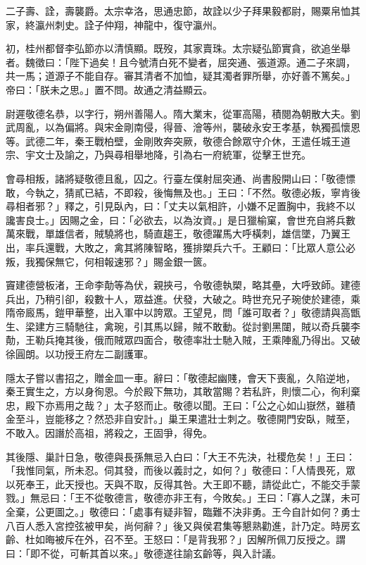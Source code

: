 \begin{pinyinscope}
 二子壽、詮，壽襲爵。太宗幸洛，思通忠節，故詮以少子拜果毅都尉，賜粟帛恤其家，終瀛州刺史。詮子仲翔，神龍中，復守瀛州。



 初，桂州都督李弘節亦以清慎顯。既歿，其家賣珠。太宗疑弘節實貪，欲追坐舉者。魏徵曰：「陛下過矣！且今號清白死不變者，屈突通、張道源。通二子來調，共一馬；道源子不能自存。審其清者不加恤，疑其濁者罪所舉，亦好善不篤矣。」帝曰：「朕未之思。」置不問。故通之清益顯云。



 尉遲敬德名恭，以字行，朔州善陽人。隋大業末，從軍高陽，積閱為朝散大夫。劉武周亂，以為偏將。與宋金剛南侵，得晉、澮等州，襲破永安王孝基，執獨孤懷恩等。武德二年，秦王戰柏壁，金剛敗奔突厥，敬德合餘眾守介休，王遣任城王道宗、宇文士及諭之，乃與尋相舉地降，引為右一府統軍，從擊王世充。



 會尋相叛，諸將疑敬德且亂，囚之。行臺左僕射屈突通、尚書殷開山曰：「敬德慓敢，今執之，猜貳已結，不即殺，後悔無及也。」王曰：「不然。敬德必叛，寧肯後尋相者邪？」釋之，引見臥內，曰：「丈夫以氣相許，小嫌不足置胸中，我終不以讒害良士。」因賜之金，曰：「必欲去，以為汝資。」是日獵榆窠，會世充自將兵數萬來戰，單雄信者，賊驍將也，騎直趨王，敬德躍馬大呼橫刺，雄信墜，乃翼王出，率兵還戰，大敗之，禽其將陳智略，獲排槊兵六千。王顧曰：「比眾人意公必叛，我獨保無它，何相報速邪？」賜金銀一篋。



 竇建德營板渚，王命李勣等為伏，親挾弓，令敬德執槊，略其壘，大呼致師。建德兵出，乃稍引卻，殺數十人，眾益進。伏發，大破之。時世充兄子琬使於建德，乘隋帝廄馬，鎧甲華整，出入軍中以誇眾。王望見，問「誰可取者？」敬德請與高甑生、梁建方三騎馳往，禽琬，引其馬以歸，賊不敢動。從討劉黑闥，賊以奇兵襲李勣，王勒兵掩其後，俄而賊眾四面合，敬德率壯士馳入賊，王乘陣亂乃得出。又破徐圓朗。以功授王府左二副護軍。



 隱太子嘗以書招之，贈金皿一車。辭曰：「敬德起幽賤，會天下喪亂，久陷逆地，秦王實生之，方以身徇恩。今於殿下無功，其敢當賜？若私許，則懷二心，徇利棄忠，殿下亦焉用之哉？」太子怒而止。敬德以聞。王曰：「公之心如山嶽然，雖積金至斗，豈能移之？然恐非自安計。」巢王果遣壯士刺之。敬德開門安臥，賊至，不敢入。因譖於高祖，將殺之，王固爭，得免。



 其後隱、巢計日急，敬德與長孫無忌入白曰：「大王不先決，社稷危矣！」王曰：「我惟同氣，所未忍。伺其發，而後以義討之，如何？」敬德曰：「人情畏死，眾以死奉王，此天授也。天與不取，反得其咎。大王即不聽，請從此亡，不能交手蒙戮。」無忌曰：「王不從敬德言，敬德亦非王有，今敗矣。」王曰：「寡人之謀，未可全棄，公更圖之。」敬德曰：「處事有疑非智，臨難不決非勇。王今自計如何？勇士八百人悉入宮控弦被甲矣，尚何辭？」後又與侯君集等懇熟勸進，計乃定。時房玄齡、杜如晦被斥在外，召不至。王怒曰：「是背我邪？」因解所佩刀反授之。謂曰：「即不從，可斬其首以來。」敬德遂往諭玄齡等，與入計議。




\end{pinyinscope}

